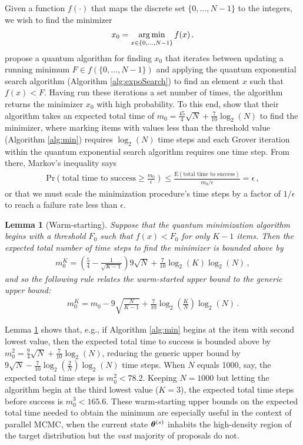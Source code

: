 \documentclass[12pt]{article} %
\newtheorem{lemma}{Lemma}
\newcommand{\argmin}{\operatornamewithlimits{arg\,min}}
\begin{document}
Given a function $f(\cdot)$ that maps the discrete set $\{0,\dots,N-1\}$ to the integers, we wish to find the minimizer
\begin{align*}
x_0 = \argmin_{x\in\{0,\dots,N-1\}} f(x) \, .
\end{align*}
 \citet{durr1996quantum} propose a quantum algorithm for finding $x_0$ that iterates between updating a running minimum $F\in f(\{0,\dots,N-1\})$ and applying the quantum exponential search algorithm (Algorithm \ref{alg:expoSearch}) to find an element $x$ such that $f(x)<F$.  Having run these iterations a set number of times, the algorithm returns the minimizer $x_0$ with high probability. 
 To this end, \citet{durr1996quantum} show that their algorithm takes an expected total time of $m_0=\frac{45}{4}\sqrt{N}+\frac{7}{10}\log_2(N)$ to find the minimizer, where marking items with values less than the threshold value (Algorithm \ref{alg:min}) requires $\log_2(N)$ time steps and each Grover iteration within the quantum exponential search algorithm requires one time step. From there, Markov's inequality says
 \begin{align*}
 \mbox{Pr}\left( \mbox{total time to success} \geq \frac{m_0}{\epsilon}\right) \leq \frac{\mbox{E}\left(\mbox{total time to success}\right)}{m_0/\epsilon}=\epsilon \, ,
 \end{align*}
 or that we must scale the minimization procedure's time steps by a factor of $1/\epsilon$ to reach a failure rate less than $\epsilon$.

\begin{lemma}[Warm-starting]\label{lem:warm}
	Suppose that the quantum minimization algorithm begins with a threshold $F_0$ such that $f(x)<F_0$ for only $K-1$ items. Then the expected total number of time steps to find the minimizer is bounded above by
	\begin{align*}
	m_0^K = \left(\frac{5}{4} - \frac{1}{\sqrt{K-1}} \right) 9\sqrt{N} + \frac{7}{10} \log_2(K) \log_2(N) \, ,
	\end{align*}
	and so the following rule relates the warm-started upper bound to the generic upper bound:
	\begin{align*}
	m_0^K = m_0 - 9\sqrt{\frac{N}{K-1}} + \frac{7}{10} \log_2 \left(\frac{K}{N} \right) \log_2(N)\, .
	\end{align*} 
\end{lemma}
Lemma \ref{lem:warm} shows that, e.g., if Algorithm \ref{alg:min} begins at the item with second lowest value, then the expected total time to success is bounded above by $m_0^2=\frac{9}{4}\sqrt{N}+\frac{7}{10}\log_2(N)$, reducing the generic upper bound by $9\sqrt{N}-\frac{7}{10}\log_2\left( \frac{2}{N}\right)\log_2(N)$ time steps.  When $N$ equals 1000, say, the expected total time steps is $m_0^2< 78.2$.  Keeping $N=1000$ but letting the algorithm begin at the third lowest value ($K=3$), the expected total time steps before success is $m_0^3<165.6$.  These warm-starting upper bounds on the expected total time needed to obtain the minimum are especially useful in the context of parallel MCMC, when the current state $\boldsymbol{\theta}^{(s)}$ inhabits the high-density region of the target distribution but the \emph{vast} majority of proposals do not.
\end{document}
